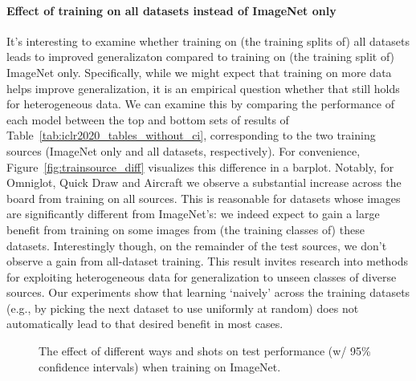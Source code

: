 \documentclass{article} \usepackage{iclr2020_conference,times}
\begin{document}
\paragraph{Effect of training on all datasets instead of ImageNet only}
It's interesting to examine whether training on (the training splits of) all
datasets leads to improved generalizaton compared to training on (the training
split of) ImageNet only. Specifically, while we might expect that training on
more data helps improve generalization, it is an empirical question whether
that still holds for heterogeneous data. We can examine this by comparing the
performance of each model between the top and bottom sets of results of
Table~\ref{tab:iclr2020_tables_without_ci}, corresponding to the two training
sources (ImageNet only and all datasets, respectively). For convenience,
Figure~\ref{fig:trainsource_diff} visualizes this difference in a barplot.
Notably, for Omniglot, Quick Draw and Aircraft we observe a substantial
increase across the board from training on all sources. This is reasonable for
datasets whose images are significantly different from ImageNet's: we indeed
expect to gain a large benefit from training on some images from (the training
classes of) these datasets.
Interestingly though, on the remainder of the test sources, we don't observe a
gain from all-dataset training. This result invites research into methods for
exploiting heterogeneous data for generalization to unseen classes of diverse
sources. Our experiments show that learning `naively' across the training
datasets (e.g., by picking the next dataset to use uniformly at random) does
not automatically lead to that desired benefit in most cases.


\begin{figure*}[h]
  \centering
	\hspace{0.001cm}
	\hspace{0.001cm}
	\caption{The effect of different ways and shots on test performance (w/ 95\% confidence intervals) when training on ImageNet.}
\end{figure*}
\end{document}
